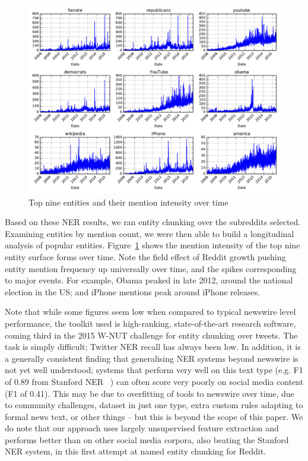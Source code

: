 \documentclass[10pt,journal,compsoc]{IEEEtran}
\begin{document}
\begin{figure}
\begin{center}
\includegraphics[width=0.79\columnwidth]{plots/entity_ts.pdf}
\caption{Top nine entities and their mention intensity over time}
\end{center}
\label{fig:entity-ts}
\end{figure}

Based on these NER results, we ran entity chunking over the subreddits selected.
Examining entities by mention count, we were then able to build a longitudinal analysis of popular entities.
Figure~\ref{fig:entity-ts} shows the mention intensity of the top nine entity surface forms over time.
Note the field effect of Reddit growth pushing entity mention frequency up universally over time, and the spikes corresponding to major events.
For example, Obama peaked in late 2012, around the national election in the US; and iPhone mentions peak around iPhone releases.

Note that while some figures seem low when compared to typical newswire level performance, the toolkit used is high-ranking, state-of-the-art research software, coming third in the 2015 W-NUT challenge for entity chunking over tweets.
The task is simply difficult; Twitter NER recall has always been low.
In addition, it is a generally consistent finding that generalising NER systems beyond newswire is not yet well understood; systems that perform very well on this text type (e.g. F1 of 0.89 from Stanford NER~\cite{derczynski2015analysis}%
) can often score very poorly on social media content (F1 of 0.41).
This may be due to overfitting of tools to newswire over time, due to community challenges, dataset in just one type, extra custom rules adapting to formal news text, or other things -- but this is beyond the scope of this paper.
We do note that our approach uses largely unsupervised feature extraction and performs better than on other social media corpora, also beating the Stanford NER system, in this first attempt at named entity chunking for Reddit.
\end{document}
